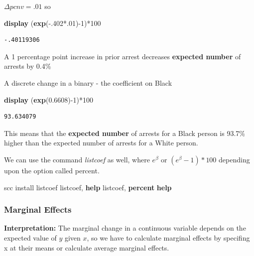 \documentclass[
]{book}
\newenvironment{Shaded}{\begin{snugshade}}{\end{snugshade}}
\newcommand{\FunctionTok}[1]{\textcolor[rgb]{0.13,0.29,0.53}{\textbf{#1}}}
\newcommand{\KeywordTok}[1]{\textcolor[rgb]{0.13,0.29,0.53}{\textbf{#1}}}
\newcommand{\NormalTok}[1]{#1}
\begin{document}
\(\Delta pcnv = .01\) so

\begin{Shaded}
\begin{Highlighting}[]
\KeywordTok{display}\NormalTok{ (}\FunctionTok{exp}\NormalTok{({-}.402*.01){-}1)*100}
\end{Highlighting}
\end{Shaded}

\begin{verbatim}
-.40119306
\end{verbatim}

A 1 percentage point increase in prior arrest decreases \textbf{expected number} of arrests by 0.4\%

A discrete change in a binary - the coefficient on Black

\begin{Shaded}
\begin{Highlighting}[]
\KeywordTok{display}\NormalTok{ (}\FunctionTok{exp}\NormalTok{(0.6608){-}1)*100 }
\end{Highlighting}
\end{Shaded}

\begin{verbatim}
93.634079
\end{verbatim}

This means that the \textbf{expected number} of arrests for a Black person is 93.7\% higher than the expected number of arrests for a White person.

We can use the command \emph{listcoef} as well, where \(e^{\beta}\) or \((e^{\beta}-1)*100\) depending upon the option called percent.

\begin{Shaded}
\begin{Highlighting}[]
\NormalTok{scc install listcoef}
\NormalTok{listcoef, }\KeywordTok{help}
\NormalTok{listcoef, }\KeywordTok{percent} \KeywordTok{help}
\end{Highlighting}
\end{Shaded}

\subsubsection*{Marginal Effects}\label{marginal-effects}

\textbf{Interpretation:} The marginal change in a continuous variable depends on the expected value of \(y\)
given \(x\), so we have to calculate marginal effects by specifing x at their means or calculate average marginal effects.
\end{document}
